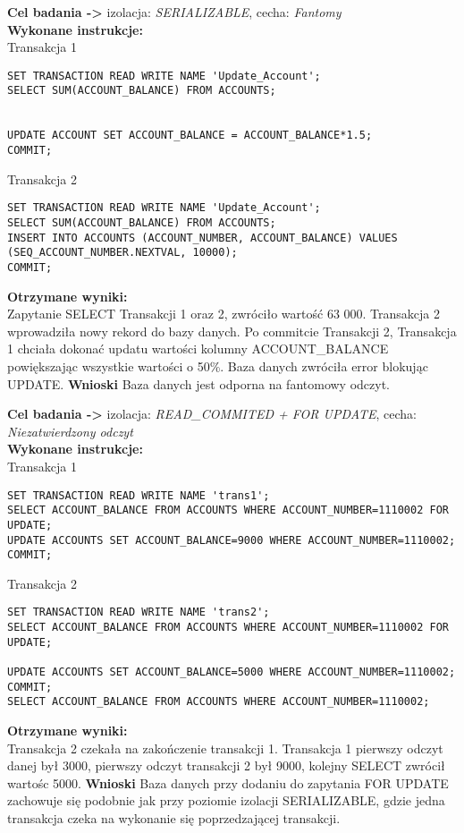 \documentclass[11pt,oneside, a4paper]{article}
\begin{document}
\textbf{Cel badania ->} izolacja:
\textit{SERIALIZABLE}, cecha:
\textit{Fantomy} \\
\textbf{Wykonane instrukcje: } \\
Transakcja 1
\begin{lstlisting}
SET TRANSACTION READ WRITE NAME 'Update_Account';
SELECT SUM(ACCOUNT_BALANCE) FROM ACCOUNTS;


UPDATE ACCOUNT SET ACCOUNT_BALANCE = ACCOUNT_BALANCE*1.5;
COMMIT;
\end{lstlisting}
Transakcja 2
\begin{lstlisting}
SET TRANSACTION READ WRITE NAME 'Update_Account';
SELECT SUM(ACCOUNT_BALANCE) FROM ACCOUNTS;
INSERT INTO ACCOUNTS (ACCOUNT_NUMBER, ACCOUNT_BALANCE) VALUES (SEQ_ACCOUNT_NUMBER.NEXTVAL, 10000);
COMMIT;
\end{lstlisting}
\textbf{Otrzymane wyniki:} \\
    Zapytanie SELECT Transakcji 1 oraz 2, zwróciło  wartość 63 000. Transakcja 2 wprowadziła nowy rekord do bazy danych. Po commitcie Transakcji 2, Transakcja 1 chciała dokonać updatu wartości kolumny ACCOUNT\_BALANCE powiększając wszystkie wartości o 50\%. Baza danych zwróciła error blokując UPDATE.
\textbf{Wnioski } Baza danych jest odporna na fantomowy odczyt.
\newpage

\textbf{Cel badania ->} izolacja:
\textit{READ\_COMMITED + FOR UPDATE}, cecha:
\textit{Niezatwierdzony odczyt} \\
\textbf{Wykonane instrukcje: } \\
Transakcja 1
\begin{lstlisting}
SET TRANSACTION READ WRITE NAME 'trans1';
SELECT ACCOUNT_BALANCE FROM ACCOUNTS WHERE ACCOUNT_NUMBER=1110002 FOR UPDATE;
UPDATE ACCOUNTS SET ACCOUNT_BALANCE=9000 WHERE ACCOUNT_NUMBER=1110002;
COMMIT;
\end{lstlisting}
Transakcja 2
\begin{lstlisting}
SET TRANSACTION READ WRITE NAME 'trans2';
SELECT ACCOUNT_BALANCE FROM ACCOUNTS WHERE ACCOUNT_NUMBER=1110002 FOR UPDATE;

UPDATE ACCOUNTS SET ACCOUNT_BALANCE=5000 WHERE ACCOUNT_NUMBER=1110002;
COMMIT;
SELECT ACCOUNT_BALANCE FROM ACCOUNTS WHERE ACCOUNT_NUMBER=1110002;
\end{lstlisting}
\textbf{Otrzymane wyniki:} \\
    Transakcja 2 czekała na zakończenie transakcji 1. Transakcja 1 pierwszy odczyt danej był 3000, pierwszy odczyt transakcji 2 był 9000, kolejny SELECT zwrócił wartośc 5000.
\textbf{Wnioski } Baza danych przy dodaniu do zapytania FOR UPDATE zachowuje się podobnie jak przy poziomie izolacji SERIALIZABLE, gdzie jedna transakcja czeka na wykonanie się poprzedzającej transakcji.
\end{document}
